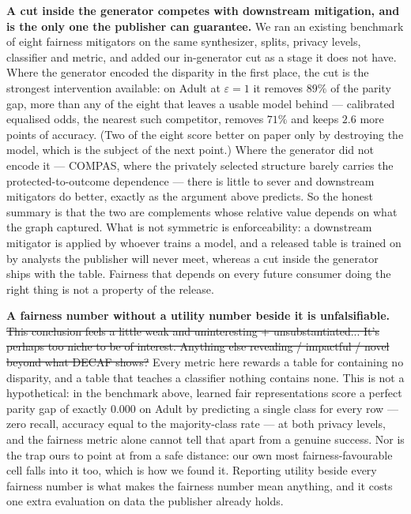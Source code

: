 {\textbf{A cut inside the generator competes with downstream mitigation, and is the
only one the publisher can guarantee.} We ran an existing benchmark of eight
fairness mitigators \citep{angelozzi2026where} on the same synthesizer, splits,
privacy levels, classifier and metric, and added our in-generator cut as a stage it
does not have. Where the generator encoded the disparity in the first place, the
cut is the strongest intervention available: on Adult at $\varepsilon{=}1$ it
removes $89\%$ of the parity gap, more than any of the eight that leaves a usable
model behind --- calibrated equalised odds, the nearest such competitor, removes
$71\%$ and keeps $2.6$ more points of accuracy. (Two of the eight score better on
paper only by destroying the model, which is the subject of the next point.) Where the generator did not encode it --- COMPAS, where the privately
selected structure barely carries the protected-to-outcome dependence --- there is
little to sever and downstream mitigators do better, exactly as the argument above
predicts. So the honest summary is that the two are complements whose relative
value depends on what the graph captured. What is not symmetric is enforceability:
a downstream mitigator is applied by whoever trains a model, and a released table
is trained on by analysts the publisher will never meet, whereas a cut inside the
generator ships with the table. Fairness that depends on every future consumer
doing the right thing is not a property of the release.

\textbf{A fairness number without a utility number beside it is unfalsifiable.} \st{This conclusion feels a little weak and uninteresting + unsubstantiated... It's perhaps too niche to be of interest. Anything else revealing / impactful / novel beyond what DECAF shows?}
Every metric here rewards a table for containing no disparity, and a table that
teaches a classifier nothing contains none. This is not a hypothetical: in the
benchmark above, learned fair representations score a perfect parity gap of
exactly $0.000$ on Adult by predicting a single class for every row --- zero
recall, accuracy equal to the majority-class rate --- at both privacy levels, and
the fairness metric alone cannot tell that apart from a genuine success. Nor is the
trap ours to point at from a safe distance: our own most fairness-favourable cell
falls into it too, which is how we found it. Reporting utility beside every
fairness number is what makes the fairness number mean anything, and it costs one
extra evaluation on data the publisher already holds.%
}
